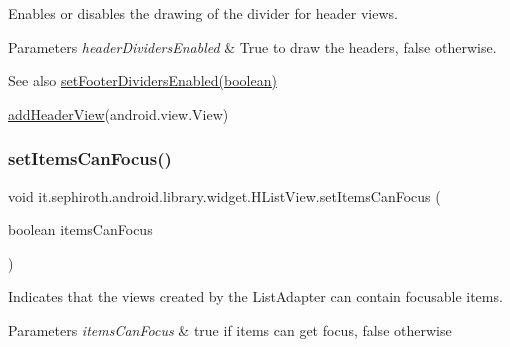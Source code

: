 Enables or disables the drawing of the divider for header views.


\begin{DoxyParams}{Parameters}
{\em header\+Dividers\+Enabled} & True to draw the headers, false otherwise.\\
\hline
\end{DoxyParams}
\begin{DoxySeeAlso}{See also}
\hyperlink{classit_1_1sephiroth_1_1android_1_1library_1_1widget_1_1_h_list_view_a782ba3ad87997849ec74ee634070c06c}{set\+Footer\+Dividers\+Enabled(boolean)} 

\hyperlink{classit_1_1sephiroth_1_1android_1_1library_1_1widget_1_1_h_list_view_aecc0066eda50ae16e9a48114dc71eb3e}{add\+Header\+View}(android.\+view.\+View) 
\end{DoxySeeAlso}
\mbox{\label{classit_1_1sephiroth_1_1android_1_1library_1_1widget_1_1_h_list_view_a5fd04e41281d6551441c62a003684942}} 
\subsubsection{\texorpdfstring{set\+Items\+Can\+Focus()}{setItemsCanFocus()}}
{\footnotesize\ttfamily void it.\+sephiroth.\+android.\+library.\+widget.\+H\+List\+View.\+set\+Items\+Can\+Focus (\begin{DoxyParamCaption}\item[{boolean}]{items\+Can\+Focus }\end{DoxyParamCaption})}

Indicates that the views created by the List\+Adapter can contain focusable items.


\begin{DoxyParams}{Parameters}
{\em items\+Can\+Focus} & true if items can get focus, false otherwise \\
\hline
\end{DoxyParams}
\mbox{\label{classit_1_1sephiroth_1_1android_1_1library_1_1widget_1_1_h_list_view_a7399b7a0121638d622240282c8d5a713}} 
